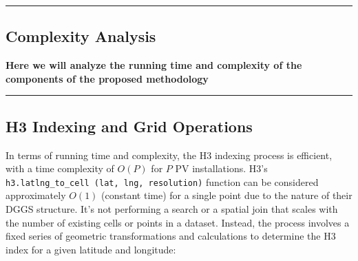 {\color{gray}\hrule}
\begin{center}
\section{Complexity Analysis}
\textbf{Here we will analyze the running time and complexity of the components of the proposed methodology}
\bigskip
\end{center}
{\color{gray}\hrule}
\subsection{H3 Indexing and Grid Operations}
In terms of running time and complexity, the H3 indexing process is efficient, with a time complexity of $O(P)$ for $P$ PV installations.
H3's \texttt{h3.latlng\string_to\string_cell (lat, lng, resolution)} function can be considered approximately $O(1)$ (constant time) for a single point due to the nature of their DGGS structure.
It's not performing a search or a spatial join that scales with the number of existing cells or points in a dataset. 
Instead, the process involves a fixed series of geometric transformations and calculations to determine the H3 index for a given latitude and longitude: 

